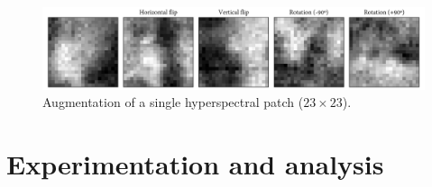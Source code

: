 \begin{figure}[ht]
    \centering
    \includegraphics[width=\linewidth]{figs/vineyard_classification/patch_augmentation.png}
	\caption{Augmentation of a single hyperspectral patch ($23\times23$). }
	\label{fig:patch_augmentation}
\end{figure}

\section{Experimentation and analysis}

